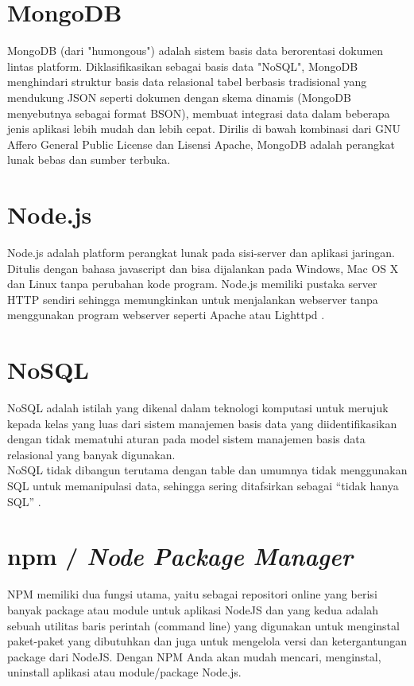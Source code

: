 	
	\section{MongoDB}
	MongoDB (dari "humongous") adalah sistem basis data berorentasi dokumen lintas platform. Diklasifikasikan sebagai basis data "NoSQL", MongoDB menghindari struktur basis data relasional tabel berbasis tradisional yang mendukung JSON seperti dokumen dengan skema dinamis (MongoDB menyebutnya sebagai format BSON), membuat integrasi data dalam beberapa jenis aplikasi lebih mudah dan lebih cepat. Dirilis di bawah kombinasi dari GNU Affero General Public License dan Lisensi Apache, MongoDB adalah perangkat lunak bebas dan sumber terbuka\cite{noauthor_mongodb_2017}.
	    
	\section{Node.js}
	Node.js adalah platform perangkat lunak pada sisi-server dan aplikasi jaringan. Ditulis dengan bahasa javascript dan bisa dijalankan pada Windows, Mac OS X dan Linux tanpa perubahan kode program. Node.js memiliki pustaka server HTTP sendiri sehingga memungkinkan untuk menjalankan webserver tanpa menggunakan program webserver seperti Apache atau Lighttpd \cite{noauthor_node.js_2014}.
	    
	\section{NoSQL}
	NoSQL adalah istilah yang dikenal dalam teknologi komputasi untuk merujuk kepada kelas yang luas dari sistem manajemen basis data yang diidentifikasikan dengan tidak mematuhi aturan pada model sistem manajemen basis data relasional yang banyak digunakan.
	\\ \indent
	NoSQL tidak dibangun terutama dengan table dan umumnya tidak menggunakan SQL untuk memanipulasi data, sehingga sering ditafsirkan sebagai “tidak hanya SQL” \cite{wikipedia_nosql_nodate}.

	\section{npm / \textit{Node Package Manager}}
	NPM memiliki dua fungsi utama, yaitu sebagai repositori online yang berisi banyak package atau module untuk aplikasi NodeJS dan yang kedua adalah sebuah utilitas baris perintah (command line) yang digunakan untuk menginstal paket-paket yang dibutuhkan dan juga untuk mengelola versi dan ketergantungan package dari NodeJS. Dengan NPM Anda akan mudah mencari, menginstal, uninstall aplikasi atau module/package Node.js\cite{azurri_node_2016}.
	

